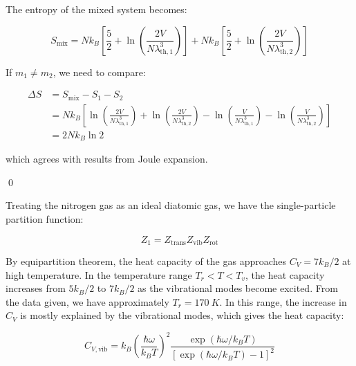 \documentclass[12pt]{article}
\begin{document}
\begin{correction}
    The entropy of the mixed system becomes:

    \begin{equation}
        S_{\text{mix}} = Nk_{B} \left[ \frac{5}{2} + \ln{\left( \frac{2V}{N\lambda_{\text{th}, 1}^{3}} \right)} \right] + Nk_{B} \left[ \frac{5}{2} + \ln{\left( \frac{2V}{N\lambda_{\text{th}, 2}^{3}} \right)} \right]
    \end{equation}

    If $m_{1} \neq m_{2}$, we need to compare:

    \begin{equation}
        \begin{split}
            \Delta S &= S_{\text{mix}} - S_{1} - S_{2} \\
            &= Nk_{B} \left[ \ln{\left( \frac{2V}{N\lambda_{\text{th}, 1}^{3}} \right)} + \ln{\left( \frac{2V}{N\lambda_{\text{th}, 2}^{3}} \right)} - \ln{\left( \frac{V}{N\lambda_{\text{th}, 1}^{3}} \right)} - \ln{\left( \frac{V}{N\lambda_{\text{th}, 2}^{3}} \right)} \right] \\
            &= 2Nk_{B} \ln{2}
        \end{split}
    \end{equation}

    which agrees with results from Joule expansion.
\end{correction}
\qed



Treating the nitrogen gas as an ideal diatomic gas, we have the single-particle partition function:

\begin{equation}
    Z_{1} = Z_{\text{trans}} Z_{\text{vib}} Z_{\text{rot}}
\end{equation}

By equipartition theorem, the heat capacity of the gas approaches $C_{V} = 7k_{B}/2$ at high temperature. In the temperature range $T_{r} < T < T_{v}$, the heat capacity increases from $5k_{B}/2$ to $7k_{B}/2$ as the vibrational modes become excited. From the data given, we have approximately $T_{r} = \qty{170}{K}$. In this range, the increase in $C_{V}$ is mostly explained by the vibrational modes, which gives the heat capacity:

\begin{equation}
    C_{V,\text{vib}} = k_{B} \left( \frac{\hbar \omega}{k_{B}T} \right)^{2} \frac{\exp\left( \hbar \omega/k_{B}T \right)}{\left[ \exp\left( \hbar \omega/k_{B}T \right) - 1 \right]^{2}}
\end{equation}
\end{document}
